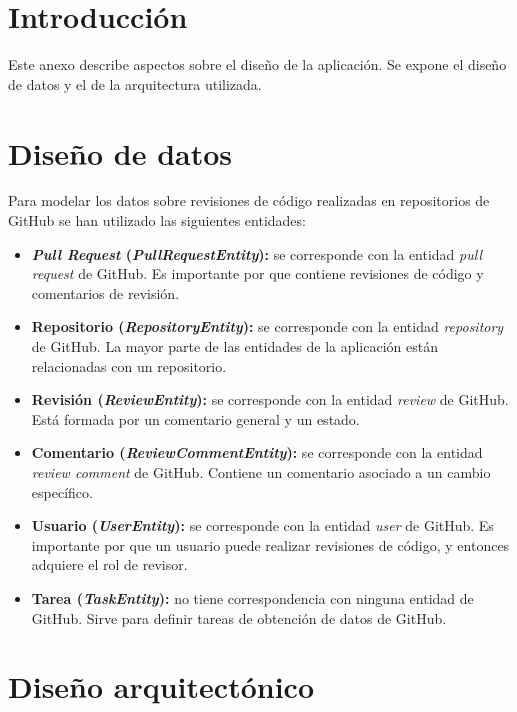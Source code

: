 
\section{Introducción}

Este anexo describe aspectos sobre el diseño de la aplicación. Se expone el diseño de datos y el de la arquitectura utilizada.

\section{Diseño de datos}

Para modelar los datos sobre revisiones de código realizadas en repositorios de GitHub se han utilizado las siguientes entidades:

\begin{itemize}
	\item \textbf{\textit{Pull Request} (\textit{PullRequestEntity}):} se corresponde con la entidad \textit{pull request} de GitHub. Es importante por que contiene revisiones de código y comentarios de revisión.
	\item \textbf{Repositorio (\textit{RepositoryEntity}):} se corresponde con la entidad \textit{repository} de GitHub. La mayor parte de las entidades de la aplicación están relacionadas con un repositorio.
	\item \textbf{Revisión (\textit{ReviewEntity}):} se corresponde con la entidad \textit{review} de GitHub. Está formada por un comentario general y un estado.
	\item \textbf{Comentario (\textit{ReviewCommentEntity}):} se corresponde con la entidad \textit{review comment} de GitHub. Contiene un comentario asociado a un cambio específico.
	\item \textbf{Usuario (\textit{UserEntity}):} se corresponde con la entidad \textit{user} de GitHub. Es importante por que un usuario puede realizar revisiones de código, y entonces adquiere el rol de revisor.
	\item \textbf{Tarea (\textit{TaskEntity}):} no tiene correspondencia con ninguna entidad de GitHub. Sirve para definir tareas de obtención de datos de GitHub.
\end{itemize}


\section{Diseño arquitectónico}

